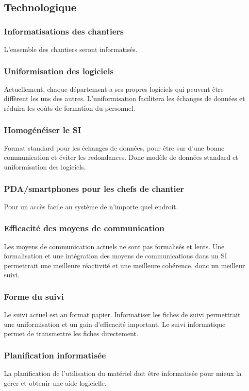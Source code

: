 \subsection{Technologique}

\subsubsection{Informatisations des chantiers}

L’ensemble des chantiers seront informatisés.

\subsubsection{Uniformisation des logiciels}

Actuellement, chaque département a ses propres logiciels qui peuvent être
diffèrent les uns des autres. L’uniformisation facilitera les échanges de
données et réduira les coûts de formation du personnel.

\subsubsection{Homogénéiser le SI}

Format standard pour les échanges de données, pour être sur d’une bonne communication
 et éviter les redondances. Donc modèle de données standard et uniformisation des logiciels.

\subsubsection{PDA/smartphones pour les chefs de chantier}

Pour un accès facile au système de n’importe quel endroit.

\subsubsection{Efficacité des moyens de communication}

Les moyens de communication actuels ne sont pas formalisés et lents. 
Une formalisation et une intégration des moyens de communications dans un
SI permettrait une meilleure réactivité et une meilleure cohérence, donc
un meilleur suivi.

\subsubsection{Forme du suivi}

Le suivi actuel est au format papier. Informatiser les fiches de suivi
permettrait une uniformisation et un gain d’efficacité important. Le suivi
informatique permet de transmettre les fiches directement.

\subsubsection{Planification informatisée}
La planification de l’utilisation du matériel doit être informatisée pour
mieux la gérer et obtenir une aide logicielle.
